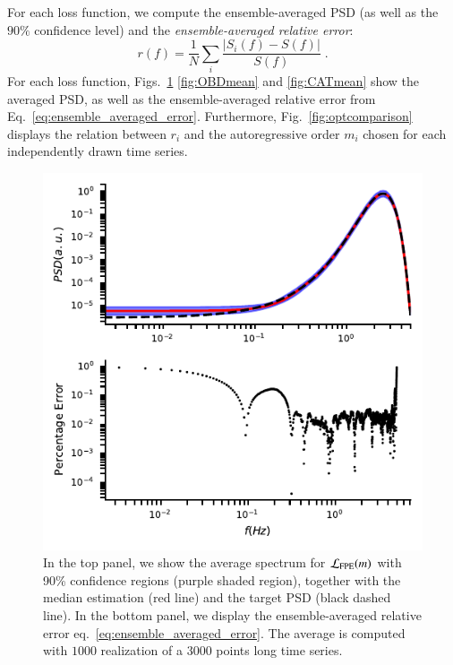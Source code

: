 \documentclass{aa}
\begin{document}
For each loss function, we compute the ensemble-averaged PSD (as well as the $90\%$ confidence level) and 
the \textit{ensemble-averaged relative error}:
\begin{equation}\label{eq:ensemble_averaged_error}
	r(f) = \frac{1}{N} \sum_i \frac{|S_i(f) - S(f)|}{S(f)} \;.
\end{equation}
For each loss function, Figs.~\ref{fig:FPEmean} \ref{fig:OBDmean} and \ref{fig:CATmean} show the averaged PSD, 
as well as the ensemble-averaged relative error from Eq.~\eqref{eq:ensemble_averaged_error}.
Furthermore, Fig.~\ref{fig:optcomparison} displays the relation between $r_i$ and the autoregressive 
order $m_i$ chosen for each independently drawn time series.

\begin{figure}[t]
	\centering
	\includegraphics[width = \linewidth]{Images/optimisers_comparison/normal/FPE_spectrum_estim.pdf}
	\caption{In the top panel, we show the average spectrum for $\mathcal{L}_{\rm FPE}(m)$ with 90\% confidence regions (purple shaded region), together with the median estimation (red line) and the target PSD (black dashed line). In the bottom panel, we display the ensemble-averaged relative error eq.~\eqref{eq:ensemble_averaged_error}.
	The average is computed with $1000$ realization of a $3000$ points long time series.}
	\label{fig:FPEmean}
\end{figure}
\end{document}
